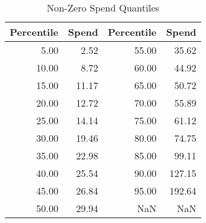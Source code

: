 \begin{table}[ht]
\centering
\caption{Non-Zero Spend Quantiles} 
\label{tab:cutoffs}
\begin{tabular}{rrrr}
  \hline
Percentile & Spend & Percentile & Spend \\ 
  \hline
5.00 & 2.52 & 55.00 & 35.62 \\ 
  10.00 & 8.72 & 60.00 & 44.92 \\ 
  15.00 & 11.17 & 65.00 & 50.72 \\ 
  20.00 & 12.72 & 70.00 & 55.89 \\ 
  25.00 & 14.14 & 75.00 & 61.12 \\ 
  30.00 & 19.46 & 80.00 & 74.75 \\ 
  35.00 & 22.98 & 85.00 & 99.11 \\ 
  40.00 & 25.54 & 90.00 & 127.15 \\ 
  45.00 & 26.84 & 95.00 & 192.64 \\ 
  50.00 & 29.94 & NaN & NaN \\ 
   \hline
\end{tabular}
\end{table}
